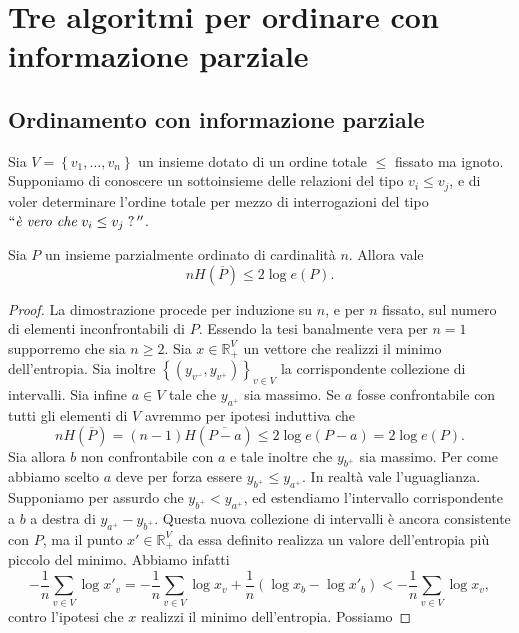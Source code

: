 \chapter{Tre algoritmi per ordinare con informazione parziale}

\section{Ordinamento con informazione parziale}
Sia \(V=\left\{v_1,\dots,v_n\right\}\) un insieme dotato di un ordine totale \(\le\) fissato ma ignoto. Supponiamo di conoscere un sottoinsieme delle relazioni del tipo \(v_i\le v_j\), e di voler determinare l'ordine totale per mezzo di interrogazioni del tipo \(``\text{\emph{è vero che}}\;v_i\le v_j\;\text{?}\,''\).

\begin{theorem}
  Sia \(P\) un insieme parzialmente ordinato di cardinalità \(n\). Allora vale
  \[nH\left(\overline{P}\right)\le 2\log{e(P)}.\]
\end{theorem}
\begin{proof}
  La dimostrazione procede per induzione su \(n\), e per \(n\) fissato, sul numero di elementi inconfrontabili di \(P\). Essendo la tesi banalmente vera per \(n=1\) supporremo che sia \(n\ge 2\). Sia \(x\in \mathbb{R}_{+}^{V}\) un vettore che realizzi il minimo dell'entropia. Sia inoltre \(\left\{\left(y_{v^-},y_{v^+}\right)\right\}_{v\in V}\) la corrispondente collezione di intervalli. Sia infine \(a\in V\) tale che \(y_{a^+}\) sia massimo.
  Se \(a\) fosse confrontabile con tutti gli elementi di \(V\) avremmo per ipotesi induttiva che
  \[nH\left(\overline{P}\right)=(n-1)H\left(\overline{P-a}\right)\le 2\log{e(P-a)=2\log{e(P)}}.\]
  Sia allora \(b\) non confrontabile con \(a\) e tale inoltre che \(y_{b^+}\) sia massimo. Per come abbiamo scelto \(a\) deve per forza essere \(y_{b^+}\le y_{a^+}\). In realtà vale l'uguaglianza. Supponiamo per assurdo che \(y_{b^+}<y_{a^+}\), ed estendiamo l'intervallo corrispondente a \(b\) a destra di \(y_{a^+}-y_{b^+}\). Questa nuova collezione di intervalli è ancora consistente con \(P\), ma il punto \(x'\in \mathbb{R}_{+}^{V}\) da essa definito realizza un valore dell'entropia più piccolo del minimo. Abbiamo infatti
  \[-\frac{1}{n}\sum_{v\in V}{\log{x'_{v}}}=-\frac{1}{n}\sum_{v\in V}{\log{x_{v}}}+\frac{1}{n}\left(\log{x_b}-\log{x'_{b}}\right)<-\frac{1}{n}\sum_{v\in V}{\log{x_v}},\]
  contro l'ipotesi che \(x\) realizzi il minimo dell'entropia.
  Possiamo 
\end{proof}

